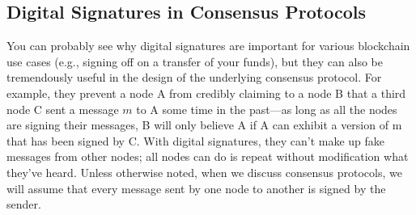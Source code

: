 \subsection{Digital Signatures in Consensus Protocols}
You can probably see why digital signatures are important for various blockchain use cases
(e.g., signing off on a transfer of your funds), but they can also be tremendously useful in
the design of the underlying consensus protocol. For example, they prevent a node A from
credibly claiming to a node B that a third node C sent a message $m$ to A some time in
the past—as long as all the nodes are signing their messages, B will only believe A if A can
exhibit a version of m that has been signed by C. With digital signatures, they can’t make
up fake messages from other nodes; all nodes can do is repeat without modification what
they’ve heard. Unless otherwise noted, when we discuss consensus protocols, we will assume
that every message sent by one node to another is signed by the sender.

